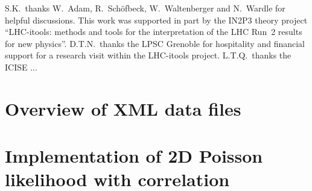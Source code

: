 \documentclass[submission, Phys]{SciPost}
\begin{document}
S.K.~thanks W.~Adam, R.~Sch\"ofbeck, W.~Waltenberger and N.~Wardle for helpful discussions. 
This work was supported in part by the IN2P3 theory project 
``LHC-itools: methods and tools for the interpretation of the LHC Run~2 results for new physics''. 
D.T.N.\ thanks the LPSC Grenoble for hospitality and financial support for a research visit within the LHC-itools project. 
L.T.Q.\ thanks the ICISE ...


\begin{appendix}

\section{Overview of XML data files}

\section{Implementation of 2D Poisson likelihood with correlation}

\end{appendix}
\end{document}
